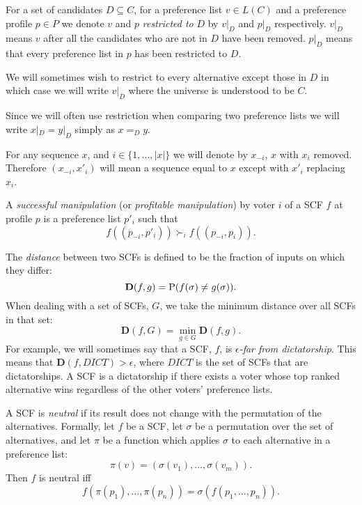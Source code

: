 	\begin{definition}
		\label{preference-restriction-definition}
		For a set of candidates $D \subseteq C$, for a preference list $v \in L(C)$ and a preference profile $p \in P$ we denote $v$ and $p$ \emph{restricted to} $D$ by $v|_D$ and $p|_D$ respectively. $v|_D$ means $v$ after all the candidates who are not in $D$ have been removed. $p|_D$ means that every preference list in $p$ has been restricted to $D$.

		We will sometimes wish to restrict to every alternative except those in $D$ in which case we will write $v|_{\overline{D}}$ where the universe is understood to be $C$.

		Since we will often use restriction when comparing two preference lists we will write $x|_D = y|_D$ simply as $x =_D y$.
	\end{definition}

	\begin{definition}
		For any sequence $x$, and $i \in \{1, \ldots, |x|\}$ we will denote by $x_{-i}$, $x$ with $x_i$ removed. Therefore $(x_{-i}, x'_i)$ will mean a sequence equal to $x$ except with $x'_i$ replacing $x_i$.
	\end{definition}

	\begin{definition}
		\label{manipulation-definition}
		A \emph{successful manipulation} (or \emph{profitable manipulation}) by voter $i$ of a SCF $f$ at profile $p$ is a preference list $p'_i$ such that
		\[
			f((p_{-i}, p'_i)) \succ_i f((p_{-i}, p_i)).
		\]
	\end{definition}

	\begin{definition}
		\label{scf-distance-definition}
		The \emph{distance} between two SCFs is defined to be the fraction of inputs on which they differ:
		\[
			\mathbf{D}(f, g) = \operatorname{P}(f (\sigma) \ne g(\sigma)).
		\]
		When dealing with a set of SCFs, $G$, we take the minimum distance over all SCFs in that set:
		\[
			\mathbf{D}(f, G) = \min_{g \in G} \mathbf{D}(f, g).
		\]
		For example, we will sometimes say that a SCF, $f$, is \emph{$\epsilon$-far from dictatorship}. This means that $\mathbf{D}(f, DICT) > \epsilon$, where $DICT$ is the set of SCFs that are dictatorships. A SCF is a dictatorship if there exists a voter whose top ranked alternative wins regardless of the other voters' preference lists.
	\end{definition}

	\begin{definition}
		A SCF is \emph{neutral} if its result does not change with the permutation of the alternatives. Formally, let $f$ be a SCF, let $\sigma$ be a permutation over the set of alternatives, and let $\pi$ be a function which applies $\sigma$ to each alternative in a preference list:
		\[
			\pi(v) = (\sigma(v_1), \ldots, \sigma(v_m)).
		\]
		Then $f$ is neutral iff
		\[
			f(\pi(p_1), \ldots, \pi(p_n)) = \sigma(f(p_1, \ldots, p_n)).
		\]
	\end{definition}
